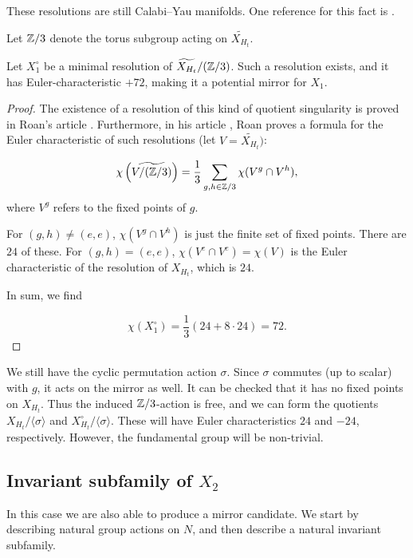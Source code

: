 These resolutions are still Calabi--Yau manifolds. One reference for this fact is \cite{clemens_double}. 

Let $\mathbb{Z}/3$ denote the torus subgroup acting on $\widetilde{X_{H_t}}$. 

\begin{theorem}
Let $X_1^\circ$ be a minimal resolution of $\widetilde{X_{H_t}}/(\mathbb{Z}/3)$. Such a resolution exists, and it has Euler-characteristic $+72$, making it a potential mirror for $X_1$.
\end{theorem}
\begin{proof}
The existence of a resolution of this kind of quotient singularity is proved in Roan's article \cite{roan_minres}. Furthermore, in his article \cite{roan_euler}, Roan proves a formula for the Euler characteristic of such resolutions (let $V=\widetilde{X_{H_t}})$:

\[
\chi\left(\widetilde{V/(\mathbb{Z}/3)} \right) = \frac{1}{3} \sum_{g,h \in \mathbb{Z}/3}  \chi(V^g \cap V^h),
\]
where $V^g$ refers to the fixed points of $g$.

For $(g,h) \neq (e,e)$, $\chi(V^g \cap V^h)$ is just the finite set of fixed points. There are $24$ of these. For $(g,h)=(e,e)$, $\chi(V^e \cap V^e)=\chi(V)$ is the Euler characteristic of the resolution of $X_{H_t}$, which is $24$.

In sum, we find

$$
\chi(X_1^\circ) = \frac 13 \left(24 + 8 \cdot 24\right)=72.
$$
\end{proof}

\begin{remark}
We still have the cyclic permutation action $\sigma$. Since $\sigma$ commutes (up to scalar) with $g$, it acts on the mirror as well. It can be checked that it has no fixed points on $X_{H_t}$. Thus the induced $\mathbb{Z}/3$-action is free, and we can form the quotients $X_{H_t}/\langle \sigma \rangle $ and $X_{H_t}^\circ/\langle \sigma \rangle$. These will have Euler characteristics $24$ and $-24$, respectively. However, the fundamental group will be non-trivial.
\end{remark}


\subsection{Invariant subfamily of $X_2$}

In this case we are also able to produce a mirror candidate. We start by describing natural group actions on $N$, and then describe a natural invariant subfamily. 

